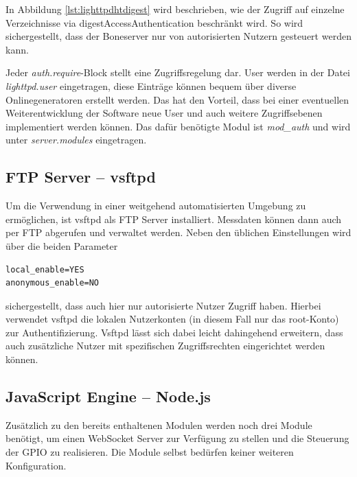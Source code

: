 In Abbildung \ref{lst:lighttpdhtdigest} wird beschrieben, wie der Zugriff auf einzelne Verzeichnisse via \gls{digestAccessAuthentication} beschränkt wird. So wird sichergestellt, dass der Boneserver nur von autorisierten Nutzern gesteuert werden kann.

Jeder \textit{auth.require}-Block stellt eine Zugriffsregelung dar. User werden in der Datei \textit{lighttpd.user} eingetragen, diese Einträge können bequem über diverse Onlinegeneratoren erstellt werden. Das hat den Vorteil, dass bei einer eventuellen Weiterentwicklung der Software neue User und auch weitere Zugriffsebenen implementiert werden können. Das dafür benötigte Modul ist \textit{mod\_auth} und wird unter \textit{server.modules} eingetragen.


\subsection{FTP Server -- vsftpd}
\label{subsec:vsftpd}
Um die Verwendung in einer weitgehend automatisierten Umgebung zu ermöglichen, ist vsftpd als FTP Server installiert. Messdaten können dann auch per FTP abgerufen und verwaltet werden. Neben den üblichen Einstellungen wird über die beiden Parameter

\begin{lstlisting}
local_enable=YES
anonymous_enable=NO
\end{lstlisting}
sichergestellt, dass auch hier nur autorisierte Nutzer Zugriff haben. Hierbei verwendet vsftpd die lokalen Nutzerkonten (in diesem Fall nur das root-Konto) zur Authentifizierung. Vsftpd lässt sich dabei leicht dahingehend erweitern, dass auch zusätzliche Nutzer mit spezifischen Zugriffsrechten eingerichtet werden können.


\subsection{JavaScript Engine -- Node.js}

Zusätzlich zu den bereits enthaltenen Modulen werden noch drei Module benötigt, um einen WebSocket Server zur Verfügung zu stellen und die Steuerung der GPIO zu realisieren. Die Module selbst bedürfen keiner weiteren Konfiguration.

